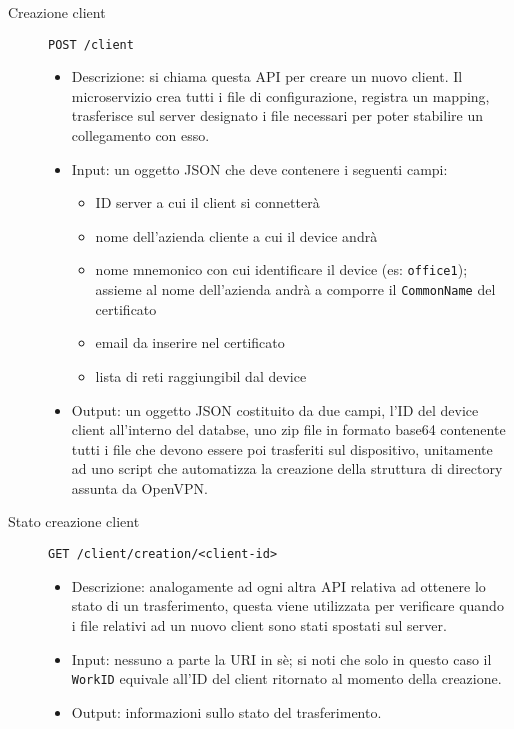 \begin{description}
    \item[Creazione client]\texttt{POST /client}
    \begin{itemize}
        \item Descrizione: si chiama questa API per creare un nuovo client. Il microservizio
        crea tutti i file di configurazione, registra un mapping, trasferisce sul
        server designato i file necessari per poter stabilire un collegamento con esso.
        \item Input: un oggetto JSON che deve contenere i seguenti campi:
        \begin{itemize}
            \item ID server a cui il client si connetterà
            \item nome dell'azienda cliente a cui il device andrà
            \item nome mnemonico con cui identificare il device (es: \texttt{office1});
            assieme al nome dell'azienda andrà a comporre il \texttt{CommonName} del
            certificato
            \item email da inserire nel certificato
            \item lista di reti raggiungibil dal device
        \end{itemize}
        \item Output: un oggetto JSON costituito da due campi, l'ID del device client
        all'interno del databse, uno zip file in formato base64 contenente tutti
        i file che devono essere poi trasferiti sul dispositivo, unitamente ad
        uno script che automatizza la creazione della struttura di directory assunta
        da OpenVPN.
    \end{itemize}

    \item[Stato creazione client]\texttt{GET /client/creation/<client-id>}
    \begin{itemize}
        \item Descrizione: analogamente ad ogni altra API relativa ad ottenere
        lo stato di un trasferimento, questa viene utilizzata per verificare
        quando i file relativi ad un nuovo client sono stati spostati sul server.
        \item Input: nessuno a parte la URI in sè; si noti che solo in questo caso il
        \texttt{WorkID} equivale all'ID del client ritornato al momento della creazione.
        \item Output: informazioni sullo stato del trasferimento.
    \end{itemize}


\end{description}
